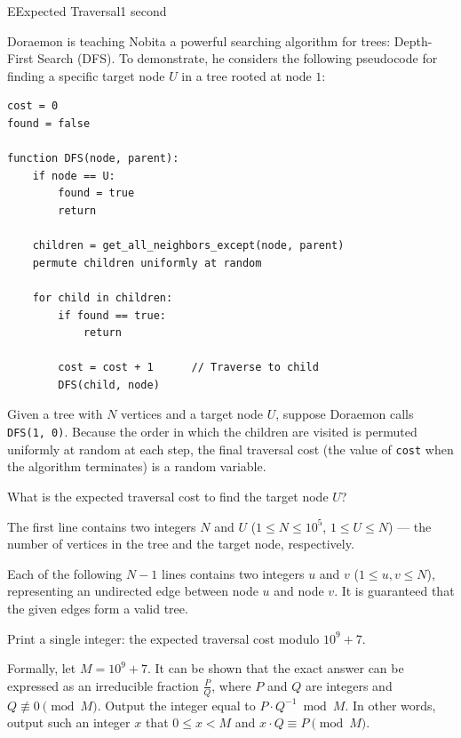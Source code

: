 \begin{problem}{E}{Expected Traversal}{1 second}

\noindent
Doraemon is teaching Nobita a powerful searching algorithm for trees: Depth-First Search (DFS). To demonstrate, he considers the following pseudocode for finding a specific target node $U$ in a tree rooted at node $1$:

\begin{verbatim}
cost = 0
found = false

function DFS(node, parent):
    if node == U:
        found = true
        return
        
    children = get_all_neighbors_except(node, parent)
    permute children uniformly at random
    
    for child in children:
        if found == true: 
            return
            
        cost = cost + 1      // Traverse to child
        DFS(child, node)
\end{verbatim}

\noindent
Given a tree with $N$ vertices and a target node $U$, suppose Doraemon calls \texttt{DFS(1, 0)}. Because the order in which the children are visited is permuted uniformly at random at each step, the final traversal cost (the value of \texttt{cost} when the algorithm terminates) is a random variable. 

\noindent
What is the expected traversal cost to find the target node $U$?

\InputFile

\noindent
The first line contains two integers $N$ and $U$ ($1 \le N \le 10^5$, $1 \le U \le N$) --- the number of vertices in the tree and the target node, respectively.

\noindent
Each of the following $N - 1$ lines contains two integers $u$ and $v$ ($1 \le u, v \le N$), representing an undirected edge between node $u$ and node $v$. It is guaranteed that the given edges form a valid tree.

\OutputFile

\noindent
Print a single integer: the expected traversal cost modulo $10^9 + 7$. 

Formally, let $M = 10^9 + 7$. It can be shown that the exact answer can be expressed as an irreducible fraction $\frac{P}{Q}$, where $P$ and $Q$ are integers and $Q \not\equiv 0 \pmod M$. Output the integer equal to $P \cdot Q^{-1} \bmod M$. In other words, output such an integer $x$ that $0 \le x < M$ and $x \cdot Q \equiv P \pmod M$.


\end{problem}
